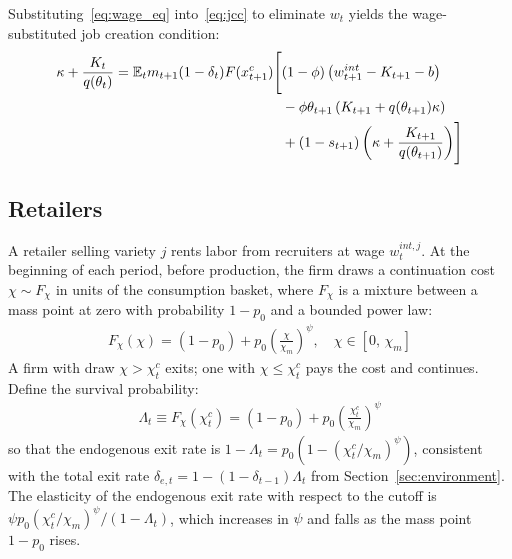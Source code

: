 \documentclass[authoryear, review, 12pt]{elsarticle}
\begin{document}
	Substituting~\eqref{eq:wage_eq} into~\eqref{eq:jcc} to 
	eliminate $w_t$ yields the wage-substituted job creation 
	condition:
	\begin{align}\label{eq:jcc_wage}
		\kappa+\frac{K_t}{q(\theta_t)} = 
		\mathbb{E}_t m_{t+1}(1-\delta_{t})F(x_{t+1}^c)
		\Biggl[&(1-\phi)\left(w_{t+1}^{int}
		-K_{t+1}-b\right) \notag \\
		&-\phi\theta_{t+1}\left(K_{t+1}
		+q(\theta_{t+1})\kappa\right) \notag \\
		&+(1-s_{t+1})\left(\kappa
		+\frac{K_{t+1}}{q(\theta_{t+1})}\right)
		\Biggr]
	\end{align}
	
	\subsection{Retailers}\label{sec:retailers}
	
	A retailer selling variety $j$ rents labor from recruiters at 
	wage $w_t^{int,j}$. At the beginning of each period, before 
	production, the firm draws a continuation cost $\chi\sim F_\chi$ 
	in units of the consumption basket, where $F_\chi$ is a mixture 
	between a mass point at zero with probability $1-p_0$ and a 
	bounded power law:
	\begin{align}\label{eq:F_chi}
		F_\chi(\chi) = (1-p_0) + p_0\left(\frac{\chi}{\chi_m}
		\right)^\psi, 
		\quad \chi\in[0,\,\chi_m]
	\end{align}
	A firm with draw $\chi>\chi_t^c$ exits; one with $\chi\leq\chi_t^c$ 
	pays the cost and continues. Define the survival probability:
	\begin{align}\label{eq:Lambda}
		\Lambda_t \equiv F_\chi(\chi_t^c) = (1-p_0) 
		+ p_0\left(\frac{\chi_t^c}{\chi_m}\right)^\psi
	\end{align}
	so that the endogenous exit rate is $1-\Lambda_t = 
	p_0\left(1-(\chi_t^c/\chi_m)^\psi\right)$, consistent with the 
	total exit rate $\delta_{e,t}=1-(1-\delta_{t-1})\Lambda_t$ from 
	Section~\ref{sec:environment}. The elasticity of the endogenous 
	exit rate with respect to the cutoff is 
	$\psi p_0(\chi_t^c/\chi_m)^\psi/(1-\Lambda_t)$, which increases 
	in $\psi$ and falls as the mass point $1-p_0$ rises.
	
\end{document}
